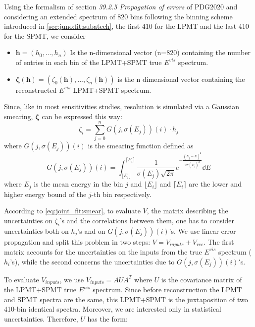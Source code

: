 \documentclass[../main.tex]{subfiles}
\begin{document}
Using the formalism of section \textit{39.2.5 Propagation of errors} of PDG2020 \cite{particle_data_group_review_2020} and considering an extended spectrum of 820 bins following the binning scheme introduced in \ref{sec:juno:fit:subatech}, the first 410 for the LPMT and the last 410 for the SPMT, we consider
\begin{itemize}
  \item $\bm{h} = (h_0, ..., h_n)$ Is the n-dimensional vector (n=820) containing the number of entries in each bin of the LPMT+SPMT true $E^{vis}$ spectrum.
  \item $\bm{\zeta}(\bm{h}) = (\zeta_0(\bm{h}), ..., \zeta_n(\bm{h}))$ is the n dimensional vector containing the reconstructed $E^{vis}$ LPMT+SPMT spectrum.
\end{itemize}

Since, like in most sensitivities studies, resolution is simulated via a Gaussian smearing, $\bm{\zeta}$ can be expressed this way:
\begin{equation}
  \label{eq:joint_fit:cov_ana:eta}
  \zeta_i  = \sum_{j=0}^n G(j, \sigma(E_j))(i) \cdot h_j
\end{equation}
where $G(j, \sigma(E_j))(i)$ is the smearing function defined as
\begin{equation}
  \label{eq:joint_fit:smear}
  G(j, \sigma(E_j))(i) = \int_{\lfloor E_i\rfloor}^{\lceil E_i \rceil} \frac{1}{\sigma(E_j)\sqrt{2\pi}} e^{-\frac{(E_j-E)^2}{2\sigma(E_j)^2}} \dd{E}
\end{equation}
where $E_j$ is the mean energy in the bin $j$ and $\lfloor E_i\rfloor$ and $\lceil E_i \rceil$ are the lower and higher energy bound of the $j$-th bin respectively.

According to \ref{eq:joint_fit:smear}, to evaluate $V$, the matrix describing the uncertainties on $\zeta_i$'s  and the correlations between them, one has to consider uncertainties both on $h_j$'s and on $G(j,\sigma(E_j))(i)$'s. We use linear error propagation and split this problem in two steps: $V = V_{inputs} + V_{rec} $. The first matrix accounts for the uncertainties on the inputs from the true $E^{vis}$ spectrum ($h_i$'s), while the second concerns the uncertainties due to $G(j,\sigma(E_j))(i)'$s.

To evaluate $V_{inputs}$, we use $V_{inputs} = AUA^T$ where $U$ is the covariance matrix of the LPMT+SPMT true $E^{vis}$ spectrum.
Since before reconstruction the LPMT and SPMT spectra are the same, this LPMT+SPMT is the juxtaposition of two 410-bin identical spectra. Moreover, we are interested only in statistical uncertainties. Therefore, $U$ has the form:
\end{document}
